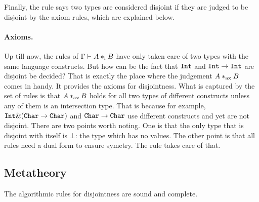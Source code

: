 \begin{comment}
The rule for disjoint quantification (\reflabel{\labeldisforall}) . Consider the following two types:
\[ (\forall (\alpha * \tyint).~\tyint \& \alpha) \qquad (\forall (\alpha * \tychar). ~\tychar \& \alpha) \]
The question is under which conditions are those two types disjoint.
In the first type $\alpha$ cannot be instantiated with $\tyint$ and in
the second case $\alpha$ cannot be instantiated with $\tychar$.
Therefore we can see that for the two bodies to be considered
disjoint, $\alpha$ cannot be instantiated with either $\tyint$ or
$\tychar$. The rule for disjoint quantification captures this fact by
requiring the bodies of disjoint quantification to be checked for
disjointness under both constraints.
\end{comment}

Finally, the rule  says two types are considered disjoint if they are
judged to be disjoint by the axiom rules, which are explained below.

\paragraph{Axioms.} Up till now, the rules of $ \Gamma \vdash A *_\textnormal{i} B $ have only
taken care of two types with the same language constructs. But how can be the fact that
$\texttt{Int}$ and $\texttt{Int} \to \texttt{Int}$ are disjoint be decided? That is exactly the
place where the judgement $ A *_\textnormal{ax} B $ comes in handy. It provides the
axioms for disjointness. What is captured by the set of rules is that $ A
*_\textnormal{ax} B $ holds for all two types of different constructs unless any of
them is an intersection type. That is because for example, $ \texttt{Int} \&
(\texttt{Char} \to \texttt{Char}) $ and $ \texttt{Char} \to \texttt{Char} $ use different constructs
and yet are not disjoint. There are two points worth noting. One is
that the only type that is disjoint with itself is $\bot$: the type
which has no values. The other point is that all rules need a dual
form to ensure symetry. The rule  takes care of that.

\subsection{Metatheory}

The algorithmic rules for disjointness are sound and complete.

%
%

